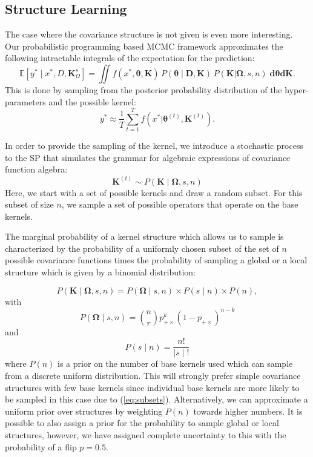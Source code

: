 \documentclass{article} %
\begin{document}
\subsection{Structure Learning}

The case where the covariance structure is not given is even more interesting. Our probabilistic programming based MCMC framework approximates the following intractable integrals of the expectation for the prediction:
\begin{equation}
\mathbb{E}[y^* \mid x^*,D,\mathbf{K}^s_{\Omega}] =\iint f(x^*,\bm{\theta},\mathbf{K})\,P(\bm{\theta} \mid \mathbf{D,\mathbf{K}})\,P(\mathbf{K}|\bm{\Omega},s,n) \; \mathbf{d} \bm{\theta} \mathbf{d} \mathbf{K}.  
\end{equation}
This is done by sampling from the posterior probability distribution of the hyper-parameters and the possible kernel:
\begin{equation}
y^* \approx \frac{1}{T} \sum^T_{t=1} f(x^* | \bm{\theta}^{(t)},\mathbf{K}^{(t)}). 
\end{equation}


In order to provide the sampling of the kernel, we introduce a stochastic process to the SP that simulates the grammar for algebraic expressions of covariance function algebra:
\begin{equation}
\mathbf{K}^{(t)} \sim  P(\mathbf{K} \mid \bm{\Omega},s,n)
\end{equation}
Here, we start with a set of possible kernels and draw a random subset. For this subset of size $n$, we sample a set of possible operators that operate on the base kernels. 

The marginal probability of a kernel structure which allows us to sample  is characterized by the probability of a uniformly chosen subset of the set of $n$ possible covariance functions times the probability of sampling a global or a local structure which is given by a binomial distribution: 

\begin{equation}
P(\mathbf{K} \mid \bm{\Omega},s,n) = P(\bm{\Omega} \mid s,n)\times P(s \mid n) \times P(n),
\end{equation}
with
\begin{equation}
P(\bm{\Omega} \mid s,n)= {n \choose r}  p_{+\times}^k (1 - p_{+\times})^{n-k}
\end{equation}
and
\begin{equation}
\label{eq:subsets}
P(s \mid n) = \frac{n!}{ \mid s \mid !}
\end{equation}
where $P(n)$ is a prior on the number of base kernels used which can sample from a discrete uniform distribution. This will strongly prefer simple covariance structures with few base kernels since individual base kernels are more likely to be sampled in this case due to (\ref{eq:subsets}). Alternatively, we can approximate a uniform prior over structures by weighting $P(n)$ towards higher numbers. It is possible to also assign a prior for the probability to sample global or local structures, however, we have assigned complete uncertainty to this with the probability of a flip $p = 0.5$.
\end{document}
